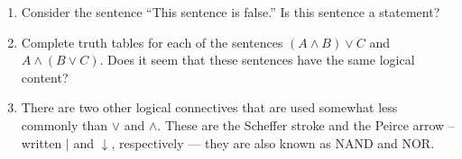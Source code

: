 \begin{enumerate}
\vfill

\item Consider the sentence ``This sentence is false.''  Is this 
sentence a statement?


\hintspagebreak

\vfill

\workbookpagebreak

\item Complete truth tables for each of the sentences 
$(A \land B) \lor C$ and
$A \land (B \lor C)$.  Does it seem that these sentences have
the same logical content?

\vfill

\hintspagebreak
\workbookpagebreak

\item \label{ex:nand_nor} There are two other logical connectives that are
used somewhat less commonly than $\lor$ and $\land$.
These are the  Scheffer stroke and the 
Peirce arrow
-- written $\vert$ and $\downarrow$, respectively ---  they are 
also known as  NAND and  NOR.


\end{enumerate}
